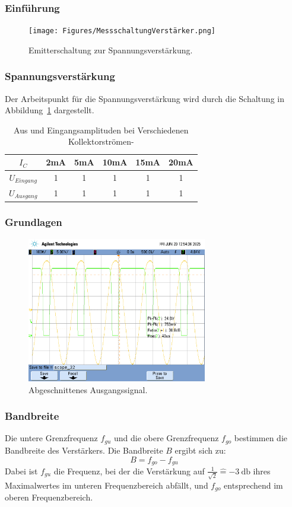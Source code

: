 \documentclass[
	a4paper, %
	12pt, %
]{CSUniSchoolLabReport}
\begin{document}
\subsubsection{Einführung}
\begin{figure}[h]
	\centering
	\texttt{[image: Figures/MessschaltungVerstärker.png]}
	\caption{Emitterschaltung zur Spannungsverstärkung.}
	\label{fig:MessschaltungVerstärker}
\end{figure}

\subsubsection{Spannungsverstärkung}
Der Arbeitspunkt für die Spannungsverstärkung wird durch die Schaltung in Abbildung~\ref{fig:MessschaltungVerstärker} dargestellt.
\begin{table}[H]
\centering
\begin{tabular}{c|c|c|c|c|c}
$I_{C}$      & 2mA & 5mA & 10mA & 15mA & 20mA \\ \hline
$U_{Eingang}$ & 1   & 1   & 1    & 1    & 1    \\ \hline
$U_{Ausgang}$ & 1   & 1   & 1    & 1    & 1   
\end{tabular}
\caption{Aus und Eingangsamplituden bei Verschiedenen Kollektorströmen- }
\label{tab:my-table}
\end{table}
\subsubsection{Grundlagen}
\begin{figure}[H]
	\centering
	\includegraphics[width=0.7\textwidth]{Figures/supplyrailskrass.png}
	\caption{Abgeschnittenes Ausgangssignal.}
	\label{fig:supplyrailskrass}
\end{figure}
\subsubsection{Bandbreite}
Die untere Grenzfrequenz $f_{gu}$ und die obere Grenzfrequenz $f_{go}$ bestimmen die Bandbreite des Verstärkers. Die Bandbreite $B$ ergibt sich zu:
\[
B = f_{go} - f_{gu}
\]
Dabei ist $f_{gu}$ die Frequenz, bei der die Verstärkung auf $\frac{1}{\sqrt{2}} \hat{=}\SI{-3}{\decibel}$ ihres Maximalwertes im unteren Frequenzbereich abfällt, und $f_{go}$ entsprechend im oberen Frequenzbereich.
\end{document}
